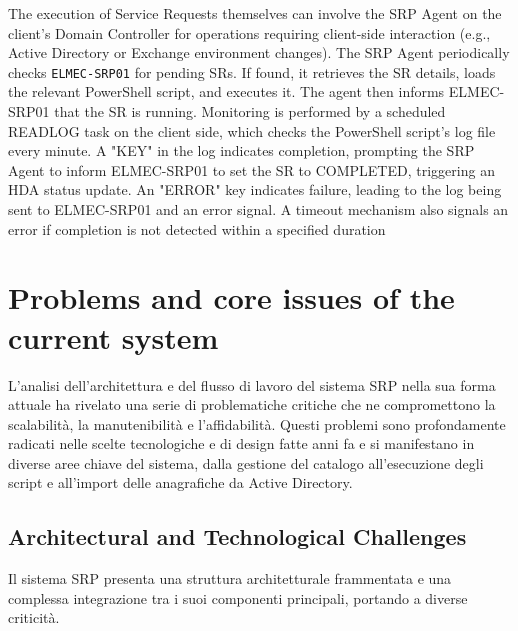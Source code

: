 The execution of Service Requests themselves can involve the SRP Agent on the client's Domain Controller for operations requiring client-side interaction (e.g., Active Directory or Exchange environment changes). The SRP Agent periodically checks \texttt{ELMEC-SRP01} for pending SRs. If found, it retrieves the SR details, loads the relevant PowerShell script, and executes it. The agent then informs ELMEC-SRP01 that the SR is running. Monitoring is performed by a scheduled READLOG task on the client side, which checks the PowerShell script's log file every minute. A "KEY" in the log indicates completion, prompting the SRP Agent to inform ELMEC-SRP01 to set the SR to COMPLETED, triggering an HDA status update. An "ERROR" key indicates failure, leading to the log being sent to ELMEC-SRP01 and an error signal. A timeout mechanism also signals an error if completion is not detected within a specified duration


\section{Problems and core issues of the current system}


L'analisi dell'architettura e del flusso di lavoro del sistema SRP nella sua forma attuale ha rivelato una serie di problematiche critiche che ne compromettono la scalabilità, la manutenibilità e l'affidabilità. Questi problemi sono profondamente radicati nelle scelte tecnologiche e di design fatte anni fa e si manifestano in diverse aree chiave del sistema, dalla gestione del catalogo all'esecuzione degli script e all'import delle anagrafiche da Active Directory.

\subsection{Architectural and Technological Challenges}

Il sistema SRP presenta una struttura architetturale frammentata e una complessa integrazione tra i suoi componenti principali, portando a diverse criticità.

